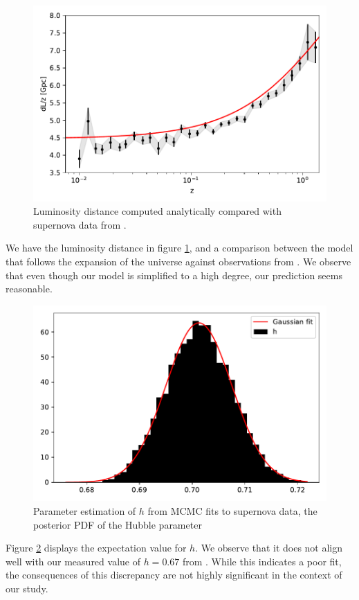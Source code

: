 \documentclass{aa}
\begin{document}
\begin{figure}[h!]
   \includegraphics[scale=0.5]{Figures/milestone_1/supernova.pdf}
   \caption{Luminosity distance computed analytically compared with supernova data from \cite{1}.}
   \label{fig:M1_supernova}
\end{figure}
We have the luminosity distance in figure \ref{fig:M1_supernova}, and a comparison between the model that follows the expansion of the universe against observations from \cite{1}. We observe that even though our model is simplified to a high degree, our prediction seems reasonable.
\begin{figure}[h!]
   \includegraphics[scale=0.5]{Figures/milestone_1/gaussian.pdf}
   \caption{Parameter estimation of $h$ from MCMC fits to supernova data, the posterior PDF of the Hubble parameter}
   \label{fig:M1_gauss}
\end{figure}
Figure \ref{fig:M1_gauss} displays the expectation value for $h$. We observe that it does not align well with our measured value of $h=0.67$ from \cite{2}. While this indicates a poor fit, the consequences of this discrepancy are not highly significant in the context of our study.
\end{document}
